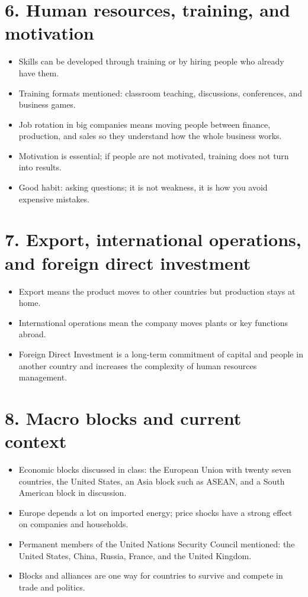 \documentclass[10pt,a4paper]{article}
\begin{document}
\section*{6. Human resources, training, and motivation}
\begin{itemize}
\item Skills can be developed through training or by hiring people who already have them.
\item Training formats mentioned: classroom teaching, discussions, conferences, and business games.
\item Job rotation in big companies means moving people between finance, production, and sales so they understand how the whole business works.
\item Motivation is essential; if people are not motivated, training does not turn into results.
\item Good habit: asking questions; it is not weakness, it is how you avoid expensive mistakes.
\end{itemize}

\section*{7. Export, international operations, and foreign direct investment}
\begin{itemize}
\item Export means the product moves to other countries but production stays at home.
\item International operations mean the company moves plants or key functions abroad.
\item Foreign Direct Investment is a long-term commitment of capital and people in another country and increases the complexity of human resources management.
\end{itemize}

\section*{8. Macro blocks and current context}
\begin{itemize}
\item Economic blocks discussed in class: the European Union with twenty seven countries, the United States, an Asia block such as ASEAN, and a South American block in discussion.
\item Europe depends a lot on imported energy; price shocks have a strong effect on companies and households.
\item Permanent members of the United Nations Security Council mentioned: the United States, China, Russia, France, and the United Kingdom.
\item Blocks and alliances are one way for countries to survive and compete in trade and politics.
\end{itemize}
\end{document}
